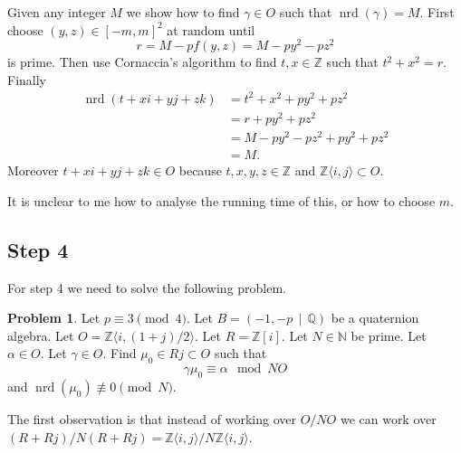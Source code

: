 \documentclass[10pt]{article}
\theoremstyle{plain}
\theoremstyle{definition}
\newtheorem{prob}[theorem]{Problem}
\newcommand{\op}{\operatorname}
\newcommand{\N}{\mathbb{N}}
\newcommand{\Z}{\mathbb{Z}}
\newcommand{\Q}{\mathbb{Q}}
\newcommand{\nrd}{\op{nrd}}
\begin{document}
Given any integer \( M \) we show how to find \( \gamma \in O \) such that \( \nrd(\gamma) = M \). First choose \( (y, z) \in [-m , m]^2 \) at random until
\[
    r = M - pf(y, z) = M - py^2 - pz^2
\]
is prime.
Then use Cornaccia's algorithm to find \( t, x \in \Z \) such that \(  t^2 + x^2 = r.\)
Finally
\begin{align*}
    \nrd(t + xi + yj + zk)
      & = t^2 + x^2 + py^2 + pz^2       \\
      & = r + py^2 + pz^2               \\
      & = M - py^2 - pz^2 + py^2 + pz^2 \\
      & = M.
\end{align*}
Moreover \( t + xi + yj + zk \in O \) because \( t, x, y, z \in \Z \) and \( \Z \langle i ,j\rangle \subset O \).

{\color{red} It is unclear to me how to analyse the running time of this, or how to choose \( m \).}

\subsection{Step 4}
For step 4 we need to solve the following problem.

\begin{prob} \label{prob: gamma*mu_0 = alpha}
    Let \( p \equiv 3 \pmod{4} \).
    Let \( B =  (-1, -p \, \mid \, \Q) \) be a quaternion algebra.
    Let \( O = \Z \langle i, (1+j) / 2 \rangle \).
    Let \( R = \Z[i] \).
    Let \( N \in \N \) be prime.
    Let \( \alpha \in O \).
    Let \( \gamma \in O \).
    Find \( \mu_0 \in Rj \subset  O \) such that
    \[
        \gamma\mu_0 \equiv \alpha \mod NO
    \]
    and \( \nrd(\mu_0) \not\equiv 0 \pmod{N} \).
\end{prob}

The first observation is that instead of working over \( O / NO \) we can work over \( (R+Rj) / N(R+Rj) = \Z \langle i, j \rangle / N \Z \langle i, j \rangle\).
\end{document}
